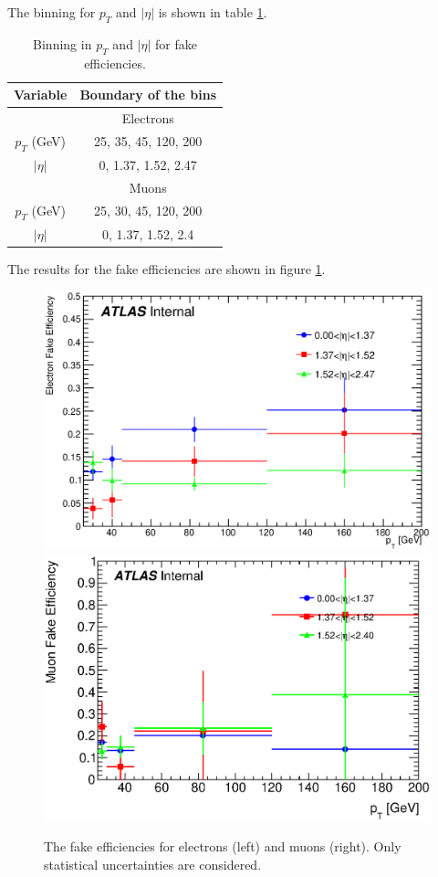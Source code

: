 The binning for $p_T$ and $|\eta|$ is shown in table \ref{tab:binning_fake_eff}.
\begin{table}[htbp]
\centering
\begin{tabular}{|c|c|}
\hline
Variable & Boundary of the bins \\
\hline
\hline
& Electrons \\
\hline
$p_T$ (GeV) &  25, 35, 45, 120, 200 \\
\hline
$|\eta|$ & 0, 1.37, 1.52, 2.47 \\
\hline
\hline
& Muons \\
\hline
$p_T$ (GeV) &  25, 30, 45, 120, 200 \\
\hline
$|\eta|$ & 0, 1.37, 1.52, 2.4 \\
\hline
\end{tabular}
\caption{Binning in $p_T$ and $|\eta|$ for fake efficiencies.}
\label{tab:binning_fake_eff}
\end{table}

The results for the fake efficiencies are shown in figure \ref{fig:result_fake_eff}.
\begin{figure}[htpb]
\centering
\includegraphics[width=0.49\linewidth]{data/plot/getFakeEffs/El_hEff.eps}
\includegraphics[width=0.49\linewidth]{data/plot/getFakeEffs/Mu_hEff.eps}
\caption{The fake efficiencies for electrons (left) and muons (right). Only statistical uncertainties are considered.}
\label{fig:result_fake_eff}
\end{figure}


